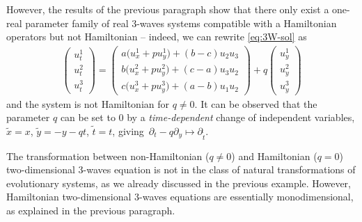 \documentclass[pdftex]{sigma}
\numberwithin{equation}{section}
\begin{document}
However, the results of the previous paragraph show that there only exist a one-real parameter family of real 3-waves systems compatible with a Hamiltonian operators but not Hamiltonian -- indeed, we can rewrite \eqref{eq:3W-sol} as
\begin{gather*}
\begin{pmatrix}u^1_t\\[1mm] u^2_t\\[1mm] u^3_t\end{pmatrix}=\begin{pmatrix}a\big(u^1_x+p u^1_y\big)+(b-c)u_2u_3\\[1mm] b\big(u^2_x+p u^2_y\big)+(c-a)u_3u_2\\[1mm] c\big(u^3_x+p u^3_y\big)+(a-b)u_1u_2\end{pmatrix}+q\begin{pmatrix} u^1_y\\[1mm] u^2_y\\[1mm] u^3_y\end{pmatrix}
\end{gather*}
and the system is not Hamiltonian for $q\neq0$. It can be observed that the parameter $q$ can be set to 0 by a \emph{time-dependent} change of independent variables, $\tilde{x}=x$, $\tilde{y}=-y-qt$, $\tilde{t}=t$, giving~${\partial_t-q\partial_y\mapsto\partial_{\tilde{t}}}$.

The transformation between non-Hamiltonian ($q\neq 0$) and Hamiltonian ($q=0$) two-dimen\-sion\-al 3-waves equation is not in the class of natural transformations of evolutionary systems, as we already discussed in the previous example. However, Hamiltonian two-dimensional 3-waves equations are essentially monodimensional, as explained in the previous paragraph.
\end{document}
